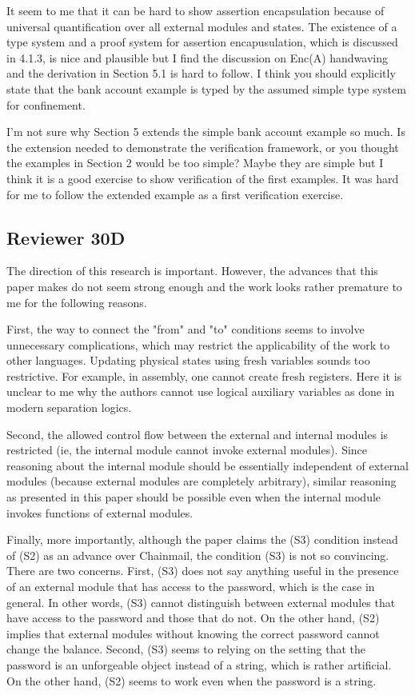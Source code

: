 \documentclass[11pt]{amsart}
\begin{document}
It seem to me that it can be hard to show assertion encapsulation
because of universal quantification over all external modules and
states.  The existence of a type system and a proof system for
assertion encapusulation, which is discussed in 4.1.3, is nice and
plausible but I find the discussion on Enc(A) handwaving and the
derivation in Section 5.1 is hard to follow.  I think you should
explicitly state that the bank account example is typed by the assumed
simple type system for confinement.

I'm not sure why Section 5 extends the simple bank account example so
much.  Is the extension needed to demonstrate the verification
framework, or you thought the examples in Section 2 would be too simple? 
Maybe they are simple but I think it is a good exercise to show verification of the first examples. 
It was hard for me to follow the extended example as a first verification exercise.

 \subsection*{Reviewer 30D}
 
The direction of this research is important. However, the advances that this paper makes do not seem strong enough and the work looks rather premature to me for the following reasons.

First, the way to connect the "from" and "to" conditions seems to involve unnecessary complications, which may restrict the applicability of the work to other languages. Updating physical states using fresh variables sounds too restrictive. For example, in assembly, one cannot create fresh registers. Here it is unclear to me why the authors cannot use logical auxiliary variables as done in modern separation logics.

Second, the allowed control flow between the external and internal modules is restricted (ie, the internal module cannot invoke external modules). Since reasoning about the internal module should be essentially independent of external modules (because external modules are completely arbitrary), similar reasoning as presented in this paper should be possible even when the internal module invokes functions of external modules.

Finally, more importantly, although the paper claims the (S3) condition instead of (S2) as an advance over Chainmail, the condition (S3) is not so convincing. There are two concerns. First, (S3) does not say anything useful in the presence of an external module that has access to the password, which is the case in general. In other words, (S3) cannot distinguish between external modules that have access to the password and those that do not. On the other hand, (S2) implies that external modules without knowing the correct password cannot change the balance. Second, (S3) seems to relying on the setting that the password is an unforgeable object instead of a string, which is rather artificial. On the other hand, (S2) seems to work even when the password is a string.



 
\end{document}
